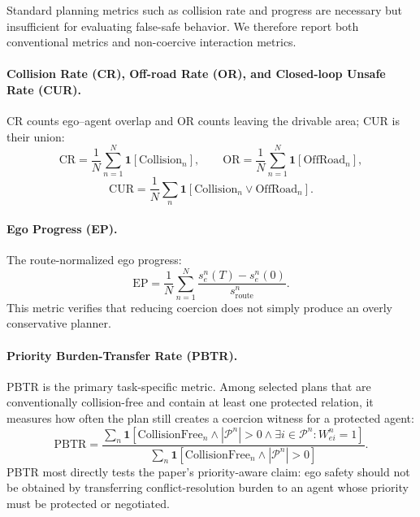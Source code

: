 \documentclass[10pt]{article}
\begin{document}
Standard planning metrics such as collision rate and progress are necessary but insufficient for evaluating false-safe behavior. We therefore report both conventional metrics and non-coercive interaction metrics.

\paragraph{Collision Rate (CR), Off-road Rate (OR), and Closed-loop Unsafe Rate (CUR).}
CR counts ego--agent overlap and OR counts leaving the drivable area; CUR is their union:
\begin{equation}
    \mathrm{CR}=\frac{1}{N}\sum_{n=1}^{N}\mathbf{1}[\mathrm{Collision}_n],
    \qquad
    \mathrm{OR}=\frac{1}{N}\sum_{n=1}^{N}\mathbf{1}[\mathrm{OffRoad}_n],
\end{equation}
\begin{equation}
    \mathrm{CUR}=\frac{1}{N}\sum_n\mathbf{1}[\mathrm{Collision}_n\vee\mathrm{OffRoad}_n].
\end{equation}

\paragraph{Ego Progress (EP).}
The route-normalized ego progress:
\begin{equation}
    \mathrm{EP}
    =
    \frac{1}{N}
    \sum_{n=1}^{N}
    \frac{
    s^{n}_{e}(T)-s^{n}_{e}(0)
    }{
    s^{n}_{\mathrm{route}}
    }.
\end{equation}
This metric verifies that reducing coercion does not simply produce an overly conservative planner.

\paragraph{Priority Burden-Transfer Rate (PBTR).}
PBTR is the primary task-specific metric. Among selected plans that are conventionally collision-free and contain at least one protected relation, it measures how often the plan still creates a coercion witness for a protected agent:
\begin{equation}
    \mathrm{PBTR}
    =
    \frac{
      \sum_n \mathbf 1[
      \mathrm{CollisionFree}_n
      \wedge |\mathcal P^n|>0
      \wedge \exists i\in\mathcal P^n:W^n_{ei}=1]
    }{
      \sum_n \mathbf 1[
      \mathrm{CollisionFree}_n
      \wedge |\mathcal P^n|>0]
    }.
\end{equation}
PBTR most directly tests the paper's priority-aware claim: ego safety should not be obtained by transferring conflict-resolution burden to an agent whose priority must be protected or negotiated.
\end{document}
